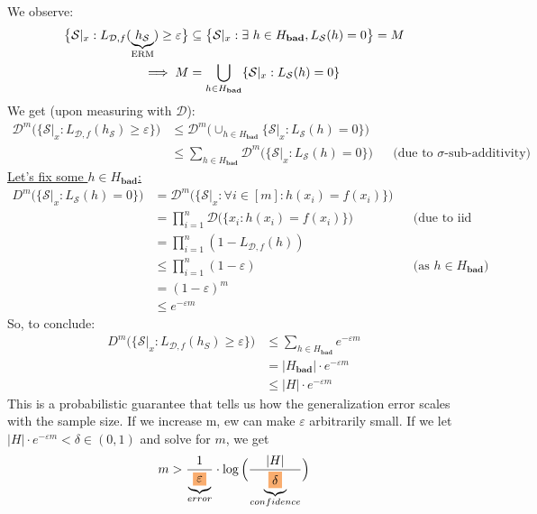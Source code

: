 \documentclass[10pt,a4paper]{article}
\theoremstyle{definition}
\theoremstyle{plain}
\begin{document}
We observe:
\begin{align*}
	\big\{\mathcal{S}|_x : L_{\mathcal{D},f}(\underbrace{h_\mathcal{S}}_{\mathclap{\text{ERM}}}) \geq \varepsilon\big\} &\subseteq \big\{\mathcal{S}|_x : \exists \ h \in H_{\mathrm{\textbf{bad}}}, L_\mathcal{S}(h) = 0 \big\}= M\\
	 \implies M &= \bigcup_{h \in H_{\mathrm{\textbf{bad}}}}\{\mathcal{S}|_x: L_{\mathcal{S}}(h) = 0\}
\end{align*}
We get (upon measuring with $\mathcal{D}$):
\begin{align*}
\mathcal{D}^m \big( \{\mathcal{S}|_x : L_{\mathcal{D},f}(h_\mathcal{S}) \geq \varepsilon\}\big) &\leq \mathcal{D}^m\big( \cup_{h \in H_{\mathrm{\textbf{bad}}}}\{\mathcal{S}|_x : L_{\mathcal{S}}(h) = 0\} \big)\\
&\leq \sum_{h \in H_{\mathrm{\textbf{bad}}}} \mathcal{D}^m \big(\{\mathcal{S}|_x : L_{\mathcal{S}}(h) = 0\}\big) && \text{(due to $\sigma$-sub-additivity)}
\end{align*}
\underline{Let's fix some $h \in H_{\mathrm{\textbf{bad}}}$:}
\begin{align*}
	D^m \big(\{\mathcal{S}|_x : L_{\mathcal{S}}(h) = 0\}\big) &= \mathcal{D}^m \big(\{\mathcal{S}|_x : \forall i \in [m]: h(x_i) = f(x_i)\}\big)\\
	&= \prod_{i = 1}^{n} \mathcal{D} \big(\{x_i: h(x_i) = f(x_i)\}\big) && \text{(due to iid assumption)}\\
	&= \prod_{i=1}^{n} (1 - L_{\mathcal{D},f}(h))\\
	&\leq \prod_{i=1}^{n} (1-\varepsilon) && \text{(as $h \in H_{\mathrm{\textbf{bad}}}$)}\\
	&= (1-\varepsilon)^m \\
	&\leq e^{-\varepsilon m}
\end{align*}
So, to conclude:
\begin{align*}
	D^m \big(\{\mathcal{S}|_x : L_{\mathcal{D},f}(h_S) \geq \varepsilon\}\big) &\leq \sum_{h \in H_{\mathrm{\textbf{bad}}}} e^{-\varepsilon m} \\ 
	&= |H_{\mathrm{\textbf{bad}}}| \cdot e^{-\varepsilon m} \\
	&\leq |H| \cdot e^{-\varepsilon m}
\end{align*}
This is a probabilistic guarantee that tells us how the generalization error scales with the sample size. If we increase m, ew can make $\varepsilon$ arbitrarily small. 
If we let $ |H| \cdot e^{-\varepsilon m} <\delta \in (0,1)$ and solve for $m$, we get 
$$ m>\frac{1}{\underbrace{\colorbox{Apricot}{$\varepsilon$}}_{error}} \cdot \log \Big(\frac{|H|}{\underbrace{\colorbox{Apricot}{$\delta$}}_{confidence}}\Big)$$
\end{document}
